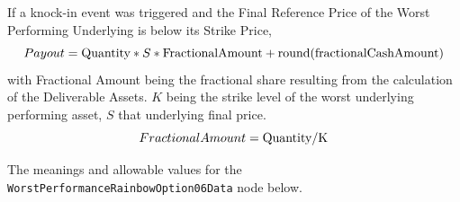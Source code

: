 If a knock-in event was triggered and the Final Reference Price of the Worst Performing Underlying
is below its Strike Price,
\begin{equation*}
  Payout = \text{\lstinline!Quantity!} * S * \text{FractionalAmount} + \text{round}(\text{fractionalCashAmount})
\end{equation*}
with Fractional Amount being the fractional share resulting from the calculation of the Deliverable Assets. $K$ being the strike level of the 
worst underlying performing asset, $S$ that underlying final price.
\begin{equation*}
  FractionalAmount = \text{\lstinline!Quantity!} / \text{K}
\end{equation*}

The meanings and allowable values for the \lstinline!WorstPerformanceRainbowOption06Data! node below.

